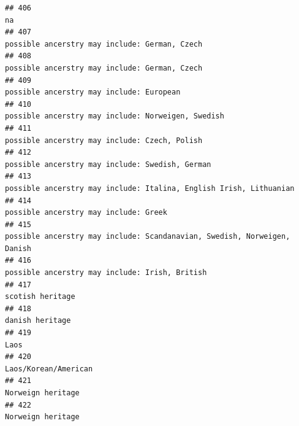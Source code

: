 \documentclass[]{article}
\begin{document}
\begin{verbatim}
## 406                                                                                                                                                  na
## 407                                                                                                       possible ancerstry may include: German, Czech
## 408                                                                                                       possible ancerstry may include: German, Czech
## 409                                                                                                            possible ancerstry may include: European
## 410                                                                                                  possible ancerstry may include: Norweigen, Swedish
## 411                                                                                                       possible ancerstry may include: Czech, Polish
## 412                                                                                                     possible ancerstry may include: Swedish, German
## 413                                                                                  possible ancerstry may include: Italina, English Irish, Lithuanian
## 414                                                                                                               possible ancerstry may include: Greek
## 415                                                                            possible ancerstry may include: Scandanavian, Swedish, Norweigen, Danish
## 416                                                                                                      possible ancerstry may include: Irish, British
## 417                                                                                                                                    scotish heritage
## 418                                                                                                                                     danish heritage
## 419                                                                                                                                                Laos
## 420                                                                                                                                Laos/Korean/American
## 421                                                                                                                                   Norweign heritage
## 422                                                                                                                                   Norweign heritage

\end{verbatim}
\end{document}
